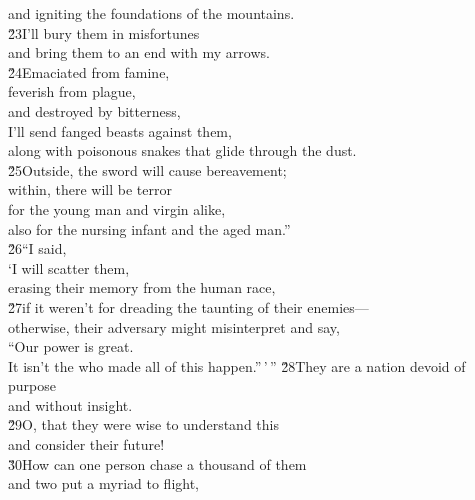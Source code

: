 \begin{poetry}
\poemll    and igniting the foundations of the mountains. \\
\poeml \v{23}I'll bury them in misfortunes \\
\poemll    and bring them to an end with my arrows. \\
\poeml \v{24}Emaciated from famine, \\
\poemll    feverish from plague, \\
\poemll    and destroyed by bitterness, \\
\poeml I'll send fanged beasts against them, \\
\poemll    along with poisonous snakes that glide through the dust. \\
\poeml \v{25}Outside, the sword will cause bereavement; \\
\poemll    within, there will be terror \\
\poemlll       for the young man and virgin alike, \\
\poemlll       also for the nursing infant and the aged man.'' \\
\poeml \v{26}``I said, \\
\poeml `I will scatter them, \\
\poemll    erasing their memory from the human race, \\
\poeml \v{27}if it weren't for dreading the taunting of their enemies--- \\
\poemll    otherwise, their adversary might misinterpret and say, \\
\poeml ``Our power is great. \\
\poemll    It isn't the  who made all of this happen.''\,'\,''
\poeml \v{28}They are a nation devoid of purpose \\
\poemll    and without insight. \\
\poeml \v{29}O, that they were wise to understand this \\
\poemll    and consider their future! \\
\poeml \v{30}How can one person chase a thousand of them \\
\poemll    and two put a myriad to flight, \\

\end{poetry}

